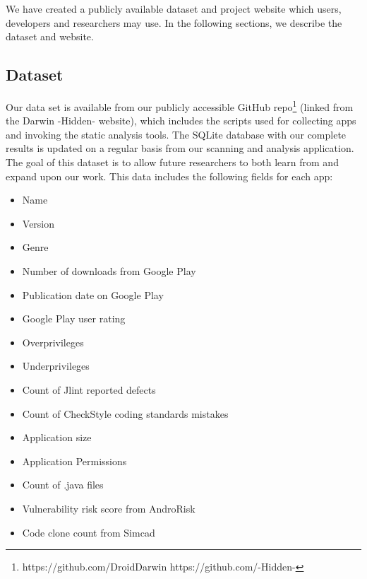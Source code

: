 
We have created a publicly available dataset and project website which users, developers and researchers may use. In the following sections, we describe the dataset and website.



\subsection{Dataset}


Our data set is available from our publicly accessible GitHub repo\footnote{\ifisnopii https://github.com/DroidDarwin \else https://github.com/-Hidden- \fi} (linked from the \ifisnopii Darwin \else -Hidden- \fi website), which includes the scripts used for collecting apps and invoking the static analysis tools. The SQLite database with our complete results is updated on a regular basis from our scanning and analysis application. The goal of this dataset is to allow future researchers to both learn from and expand upon our work. This data includes the following fields for each app:

\begin{itemize}
    \setlength{\itemsep}{0pt} %
    \setlength{\parskip}{0pt} %
    \setlength{\parsep}{0pt}  %

  \item Name
  \item Version
  \item Genre
  \item Number of downloads from Google Play
  \item Publication date on Google Play
  \item Google Play user rating
  \item Overprivileges
  \item Underprivileges
  \item Count of Jlint reported defects
  \item Count of CheckStyle coding standards mistakes
  \item Application size
  \item Application Permissions
  \item Count of .java files
  \item Vulnerability risk score from AndroRisk
  \item Code clone count from Simcad
\end{itemize}

